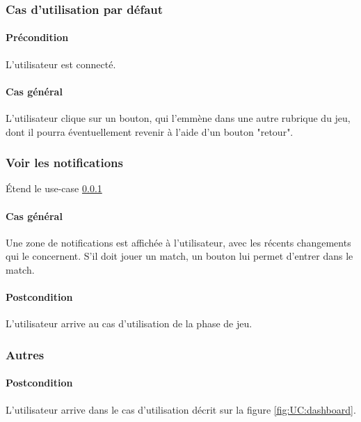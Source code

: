 \subsubsection{Cas d'utilisation par défaut}
    \label{UC:dashboard}
    \paragraph{Précondition} L'\gls{utilisateur} est connecté.
    \paragraph{Cas général} L'utilisateur clique sur un bouton, qui l'emmène dans une autre rubrique du jeu, dont il pourra éventuellement revenir à l'aide d'un bouton "retour".

\subsubsection{Voir les notifications}
    \'Etend le use-case \ref{UC:dashboard}
    \paragraph{Cas général} Une zone de notifications est affichée à l'utilisateur, avec les récents changements qui le concernent. S'il doit jouer un match, un bouton lui permet d'entrer dans le match.
    \paragraph{Postcondition} L'utilisateur arrive au cas d'utilisation de la phase de jeu.

\subsubsection{Autres}
    \paragraph{Postcondition} L'utilisateur arrive dans le cas d'utilisation décrit sur la figure \ref{fig:UC:dashboard}.


